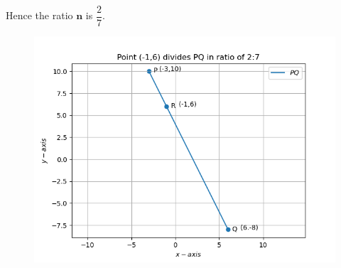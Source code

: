 \documentclass[12pt]{article}
\let\vec\mathbf
\begin{document}
\begin{enumerate}
Hence the ratio $\vec{n}$ is $\dfrac{2}{7}$.
\begin{figure}[!h]
 \begin{center}
  \includegraphics[width=\columnwidth]{figs/Figure_1.png}
 \end{center}
\caption{}
\label{fig:Fig1}
\end{figure}


\end{enumerate}
\end{document}
